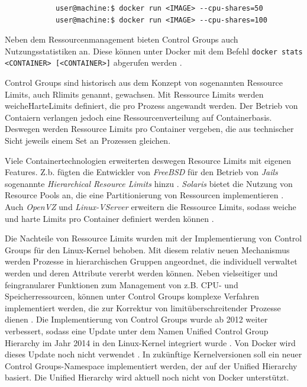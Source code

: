 \documentclass[../main.tex]{subfiles}
\begin{document}
		\begin{lstlisting}
			user@machine:$ docker run <IMAGE> --cpu-shares=50
			user@machine:$ docker run <IMAGE> --cpu-shares=100
		\end{lstlisting}

		Neben dem Ressourcenmanagement bieten Control Groups auch Nutzungsstatistiken an. Diese können unter Docker mit dem Befehl \texttt{docker stats <CONTAINER> [<CONTAINER>]} abgerufen werden \cite{dockerMetrics}.

		Control Groups sind historisch aus dem Konzept von sogenannten Ressource Limits, auch Rlimits genannt, gewachsen. Mit Ressource Limits werden \gls{weicheHarteLimits} definiert, die pro Prozess angewandt werden. Der Betrieb von Contaiern verlangen jedoch eine Ressourcenverteilung auf Containerbasis. Deswegen werden Ressource Limits pro Container vergeben, die aus technischer Sicht jeweils einem Set an Prozessen gleichen.


		Viele Containertechnologien erweiterten deswegen Resource Limits mit eigenen Features. Z.b. fügten die Entwickler von \emph{FreeBSD} für den Betrieb von \emph{Jails} sogenannte \emph{Hierarchical Resource Limits} hinzu \cite{freeBsdRCTL}. \emph{Solaris} bietet die Nutzung von Resource Pools an, die eine Partitionierung von Ressourcen implementieren \cite{cgroupsUniHierarchyDoc}. Auch \emph{OpenVZ} und \emph{Linux-VServer} erweitern die Ressource Limits, sodass weiche und harte Limits pro Container definiert werden können \cite[S.15f.]{dockerSec2}.

		Die Nachteile von Ressource Limits wurden mit der Implementierung von Control Groups für den Linux-Kernel behoben. Mit diesem relativ neuen Mechanismus werden Prozesse in hierarchischen Gruppen angeordnet, die individuell verwaltet werden und deren Attribute vererbt werden können. Neben vielseitiger und feingranularer Funktionen zum Management von z.B. CPU- und Speicherressourcen, können unter Control Groups komplexe Verfahren implementiert werden, die zur Korrektur von limitüberschreitender Prozesse dienen \cite{cgroupsRedhat}. Die Implementierung von Control Groups wurde ab 2012 weiter verbessert, sodass eine Update unter dem Namen Unified Control Group Hierarchy im Jahr 2014 in den Linux-Kernel integriert wurde \cite{cgroupsFixing}\cite{cgroupsUniHierarchy}. Von Docker wird dieses Update noch nicht verwendet \cite{githubCgroupsUniHierNotSupported}. In zukünftige Kernelversionen soll ein neuer Control Groups-Namespace implementiert werden, der auf der Unified Hierarchy basiert. Die Unified Hierarchy wird aktuell noch nicht von Docker unterstützt.
\end{document}
